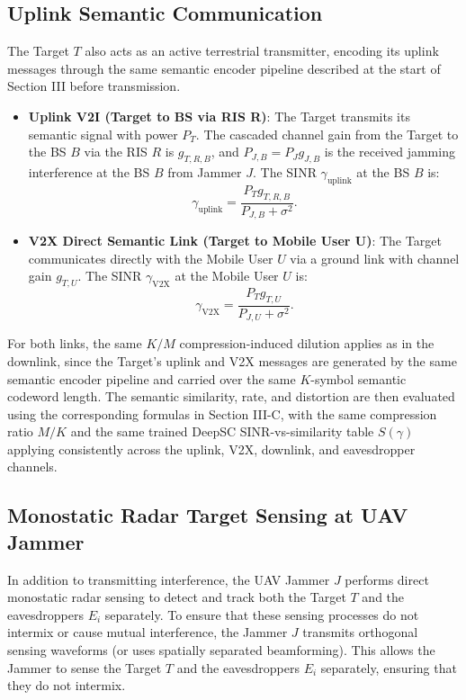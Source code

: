 \documentclass[journal,onecolumn]{IEEEtran}
\begin{document}
\subsection{Uplink Semantic Communication}
The Target $T$ also acts as an active terrestrial transmitter, encoding its uplink messages through the same semantic encoder pipeline described at the start of Section III before transmission.
\begin{itemize}
    \item \textbf{Uplink V2I (Target to BS via RIS R)}:
    The Target transmits its semantic signal with power $P_T$. The cascaded channel gain from the Target to the BS $B$ via the RIS $R$ is $g_{T, R, B}$, and $P_{J, B} = P_J g_{J, B}$ is the received jamming interference at the BS $B$ from Jammer $J$. The SINR $\gamma_{\text{uplink}}$ at the BS $B$ is:
    \begin{equation}
        \gamma_{\text{uplink}} = \frac{P_T g_{T, R, B}}{P_{J, B} + \sigma^2}.
    \end{equation}
    
    \item \textbf{V2X Direct Semantic Link (Target to Mobile User U)}:
    The Target communicates directly with the Mobile User $U$ via a ground link with channel gain $g_{T, U}$. The SINR $\gamma_{\text{V2X}}$ at the Mobile User $U$ is:
    \begin{equation}
        \gamma_{\text{V2X}} = \frac{P_T g_{T, U}}{P_{J, U} + \sigma^2}.
    \end{equation}
\end{itemize}
For both links, the same $K/M$ compression-induced dilution applies as in the downlink, since the Target's uplink and V2X messages are generated by the same semantic encoder pipeline and carried over the same $K$-symbol semantic codeword length. The semantic similarity, rate, and distortion are then evaluated using the corresponding formulas in Section III-C, with the same compression ratio $M/K$ and the same trained DeepSC SINR-vs-similarity table $S(\gamma)$ applying consistently across the uplink, V2X, downlink, and eavesdropper channels.

\subsection{Monostatic Radar Target Sensing at UAV Jammer}
In addition to transmitting interference, the UAV Jammer $J$ performs direct monostatic radar sensing to detect and track both the Target $T$ and the eavesdroppers $E_i$ separately. To ensure that these sensing processes do not intermix or cause mutual interference, the Jammer $J$ transmits orthogonal sensing waveforms (or uses spatially separated beamforming). This allows the Jammer to sense the Target $T$ and the eavesdroppers $E_i$ separately, ensuring that they do not intermix.
\end{document}
